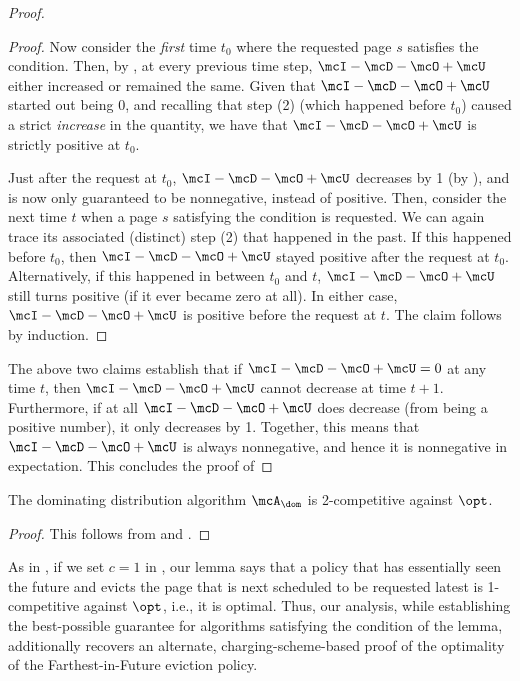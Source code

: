 \begin{proof}
\begin{proof}
        Now consider the \textit{first} time $t_0$ where the requested page $s$ satisfies the condition. Then, by , at every previous time step, $\mcI - \mcD - \mcO + \mcU$ either increased or remained the same. Given that $\mcI - \mcD - \mcO + \mcU$ started out being 0, and recalling that step (2) (which happened before $t_0$) caused a strict \textit{increase} in the quantity, we have that $\mcI - \mcD - \mcO + \mcU$ is strictly positive at $t_0$.

        Just after the request at $t_0$, $\mcI - \mcD - \mcO + \mcU$ decreases by 1 (by ), and is now only guaranteed to be nonnegative, instead of positive. Then, consider the next time $t$ when a page $s$ satisfying the condition is requested. We can again trace its associated (distinct) step (2) that happened in the past. If this happened before $t_0$, then $\mcI - \mcD - \mcO + \mcU$ stayed positive after the request at $t_0$. Alternatively, if this happened in between $t_0$ and $t$, $\mcI - \mcD - \mcO + \mcU$ still turns positive (if it ever became zero at all). In either case, $\mcI - \mcD - \mcO + \mcU$ is positive before the request at $t$. The claim follows by induction.
    \end{proof}

    The above two claims establish that if $\mcI - \mcD - \mcO + \mcU=0$ at any time $t$, then $\mcI - \mcD - \mcO + \mcU$ cannot decrease at time $t+1$. Furthermore, if at all $\mcI - \mcD - \mcO + \mcU$ does decrease (from being a positive number), it only decreases by 1. Together, this means that $\mcI - \mcD - \mcO + \mcU$ is always nonnegative, %
    and hence it is nonnegative in expectation. This concludes the proof of 
\end{proof}

\begin{corollary}
    \label{corollary:dom-is-2-competitive}
    The dominating distribution algorithm $\mcA_\dom$ is 2-competitive against $\opt$.
\end{corollary}
\begin{proof}
    This follows from  and .
\end{proof}

\begin{remark}
    \label{remark:optimal-fifo}
    As in , if we set $c=1$ in , our lemma says that a policy that has essentially seen the future and evicts the page that is next scheduled to be requested latest is 1-competitive against $\opt$, i.e., it is optimal. Thus, our analysis, while establishing the best-possible guarantee for algorithms satisfying the condition of the lemma, additionally recovers an alternate, charging-scheme-based proof of the optimality of the Farthest-in-Future eviction policy.
\end{remark}

